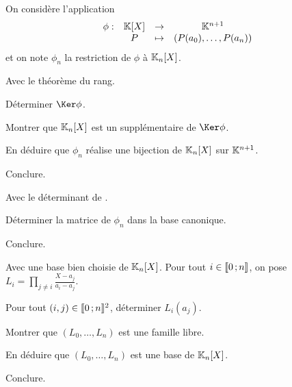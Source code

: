 \begin{exercice}
On considère l'application
\[
\begin{array}{lccc}
\phi : & \mathbb{K}[X] &\to& \mathbb{K}^{n+1}\\
&P&\mapsto&(P(a_0),\ldots,P(a_n))
\end{array}
\]
et on note $\phi_n$ la restriction de $\phi$ à $\mathbb{K}_n[X]$.
\begin{questions}
\item Avec le théorème du rang.
\begin{questions}
\item Déterminer $\Ker \phi$.

\item Montrer que $\mathbb{K}_n[X]$ est un supplémentaire de $\Ker \phi$.

\item En déduire que $\phi_n$ réalise une bijection de $\mathbb{K}_n[X]$ sur $\mathbb{K}^{n+1}$.

\item Conclure.
\end{questions}

\item Avec le déterminant de .
\begin{questions}
\item Déterminer la matrice de $\phi_n$ dans la base canonique.

\item Conclure.
\end{questions}

\item Avec une base bien choisie de $\mathbb{K}_n[X]$. Pour tout $i \in \llbracket 0\,; n \rrbracket$, on pose $L_i = \prod\limits_{j \neq i} \frac{X - a_j}{a_i - a_j}$.
\begin{questions}
\item Pour tout $(i, j) \in \llbracket 0\,; n \rrbracket^2$, déterminer $L_i(a_j)$.

\item Montrer que $(L_0,\ldots,L_n)$ est une famille libre.

\item En déduire que $(L_0,\ldots,L_n)$ est une base de $\mathbb{K}_n[X]$.

\item Conclure.
\end{questions}
\end{questions}
\end{exercice}

